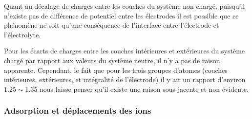 Quant au décalage de charges entre les couches du système non chargé, puisqu'il n'existe pas de différence de potentiel entre les électrodes il est possible que ce phénomène ne soit qu'une conséquence de l'interface entre l'électrode et l'électrolyte.

Pour les écarts de charges entre les couches intérieures et extérieures du système chargé par rapport aux valeurs du système neutre, il n'y a pas de raison apparente. Cependant, le fait que pour les trois groupes d'atomes (couches intérieures, extérieures, et intégralité de l'électrode) il y ait un rapport d'environ $\num{1.25}\sim \num{1.35}$ nous laisse penser qu'il existe une raison sous-jacente et non évidente.

    \subsubsection{Adsorption et déplacements des ions}


